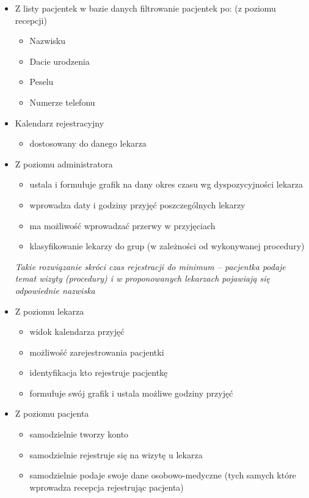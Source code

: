 \documentclass[polish,12pt]{aghthesis}
\begin{document}
\begin{itemize}
    \item Z listy pacjentek w bazie danych filtrowanie pacjentek po:  (z poziomu recepcji) \begin{itemize}
        \item Nazwisku
        \item Dacie urodzenia
        \item Peselu
        \item Numerze telefonu
    \end{itemize}
    \item Kalendarz rejestracyjny \begin{itemize}
        \item dostosowany do danego lekarza
    \end{itemize}
    \item Z poziomu administratora \begin{itemize}
        \item ustala i formułuje grafik na dany okres czasu wg dyspozycyjności lekarza
        \item wprowadza daty i godziny przyjęć poszczególnych lekarzy 
        \item ma możliwość wprowadzać przerwy w przyjęciach 
        \item klasyfikowanie lekarzy do grup (w zależności od wykonywanej procedury)
    \end{itemize}
    \emph{Takie rozwiązanie skróci czas rejestracji do minimum – pacjentka podaje temat wizyty (procedury) i w proponowanych lekarzach pojawiają się odpowiednie nazwiska}
    \item Z poziomu lekarza \begin{itemize}
        \item widok kalendarza przyjęć
        \item możliwość zarejestrowania pacjentki 
        \item identyfikacja kto rejestruje pacjentkę
        \item formułuje swój grafik i ustala możliwe godziny przyjęć %
    \end{itemize}
    \item Z poziomu pacjenta \begin{itemize} %
      \item samodzielnie tworzy konto
      \item samodzielnie rejestruje się na wizytę u lekarza
      \item samodzielnie podaje swoje dane osobowo-medyczne (tych samych które wprowadza recepcja rejestrując pacjenta)

\end{itemize}
\end{itemize}
\end{document}

